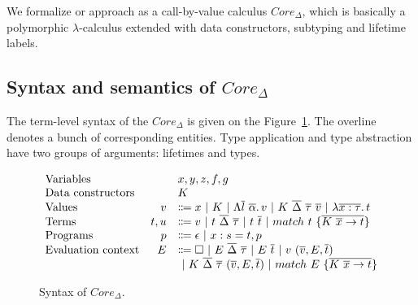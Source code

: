 \documentclass[11pt]{article}
\newcommand{\vor}{~|~}
\newcommand{\ap}{~}
\begin{document}
    We formalize or approach as a call-by-value calculus $Core_{\Delta}$, which is basically a polymorphic $\lambda$-calculus extended with data constructors, subtyping and lifetime labels.

    \subsection{Syntax and semantics of $Core_\Delta$}

    The term-level syntax of the $Core_\Delta$ is given on the Figure~\ref{fig:core-syntax}.
    The overline denotes a bunch of corresponding entities.
    Type application and type abstraction have two groups of arguments: lifetimes and types.

    \begin{figure}
        \centering
        \[
            \begin{array}{lrl}
                \text{Variables}          &   & x, y, z, f, g                                                                                                                          \\
                \text{Data constructors}  &   & K                                                                                                                                      \\
                \text{Values} & v & \Coloneqq x \vor K \vor \Lambda \overline{l}~\overline{\alpha} \ldotp v \vor K\ap\overline{\Delta}\ap \overline{\tau} \ap \overline{v} \vor \lambda \overline{x : \tau}\ldotp t
                \\
                \text{Terms} & t, u & \Coloneqq v \vor t\ap\overline{\Delta}\ap\overline{\tau} \vor t\ap \overline{t} \vor match ~ t ~\{\overline{K \ap \overline{x} \to t}\}
                \\
                \text{Programs} & p & \Coloneqq \epsilon \vor x : s = t, p
                \\
                \text{Evaluation context} & E & \Coloneqq \square \vor E \ap\overline{\Delta}\ap \overline{\tau} \vor E \ap \overline{t} \vor v \ap (\overline{v}, E, \overline{t})    \\
                &   & \vor K\ap\overline{\Delta}\ap\overline{\tau}\ap(\overline{v}, E, \overline{t}) \vor match\ap E\ap \{\overline{K\ap\overline{x}\to t}\}
            \end{array}
        \]
        \caption{Syntax of $Core_\Delta$.}
        \label{fig:core-syntax}
    \end{figure}
\end{document}
